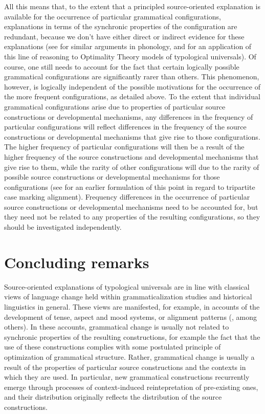 \documentclass[output=paper]{langsci/langscibook}
\begin{document}
All this means that, to the extent that a principled source-oriented
explanation is available for the occurrence of particular grammatical
configurations, explanations in terms of the synchronic properties of
the configuration are redundant, because we don't have either direct
or indirect evidence for these explanations (see \citealt{Blevins2004} for
similar arguments in phonology, and \citealt{Newmeyer2002,Newmeyer2004} for an application of
this line of reasoning to Optimality Theory models of typological
universals). Of course, one still needs to account for the fact that
certain logically possible grammatical configurations
are significantly rarer than others. This phenomenon, however, is logically
independent of the possible motivations for the occurrence of the more
frequent configurations, as
detailed above. To the extent that
individual grammatical configurations arise due to properties of
particular source constructions or developmental mechanisms, any differences in the frequency of particular
configurations will reflect differences in the frequency of
the source constructions or developmental mechanisms that give
rise to those configurations. The higher
frequency of particular configurations will then  be a result of the higher frequency of the  source
constructions and developmental mechanisms that give rise to them,
while the rarity of other configurations
will  due to the rarity of possible
source constructions or developmental mechanisms for those
configurations (see \citealt{Harris2008} for an earlier formulation of this point
in regard to tripartite case marking alignment). Frequency differences in the occurrence of particular source
constructions or developmental mechanisms need to be
accounted for, but they need not be related to any properties of the
resulting configurations, so they should be investigated independently.

\section{Concluding remarks}
Source-oriented explanations of typological universals are  in line with classical
views of language change held within
grammaticalization studies and historical linguistics in
general. These views are manifested, for example, in accounts of the
development of tense, aspect and mood systems, or alignment
patterns (\citealt{BybeeEtAl1994,HarrisCampbell1995,Gildea1998,TraugottDasher2002}, among others). In these accounts, grammatical change
is usually not related to synchronic properties of the resulting
constructions, for example the fact that the use of these
constructions complies with some postulated principle of optimization
of grammatical structure. Rather, grammatical change is usually a result of the properties of particular
source constructions and the contexts in which they are used. In
particular, new grammatical constructions recurrently emerge through
processes of context-induced reintepretation of pre-existing
ones, and their distribution originally reflects the distribution of the
source constructions. 
\end{document}

